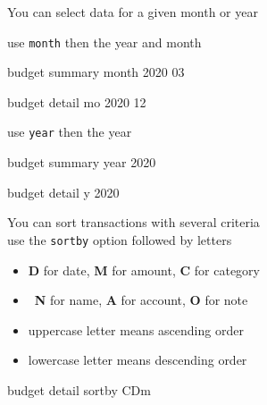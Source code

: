 \documentclass[12pt,letterpaper]{article}
\begin{document}
\begin{framed}
    \begin{minipage}[t][3in][t]{5in}
        \Large
        You can select data for a given month or year

        use \lstinline[language=budget,basicstyle=\large]!month! then the year and month\\
        \begin{budget}
            budget summary month 2020 03

            budget detail mo 2020 12
        \end{budget}
        use  \lstinline[language=budget,basicstyle=\large]!year! then the year\\
        \begin{budget}
            budget summary year 2020

            budget detail y 2020
        \end{budget}
    \end{minipage}
\end{framed}
\begin{framed}
    \begin{minipage}[t][3in][t]{5in}
        \Large
        You can sort transactions with several criteria\\

        use the \lstinline[language=budget,basicstyle=\Large]!sortby! option followed by letters
        \begin{itemize}
            \item \textbf{D} for date, \textbf{M} for amount, \textbf{C} for category
            \item \textbf{N} for name, \textbf{A} for account, \textbf{O} for note
            \item uppercase letter means ascending order
            \item lowercase letter means descending order
        \end{itemize}
        \begin{budget}
            budget detail sortby CDm
        \end{budget}
    \end{minipage}
\end{framed}
\end{document}
